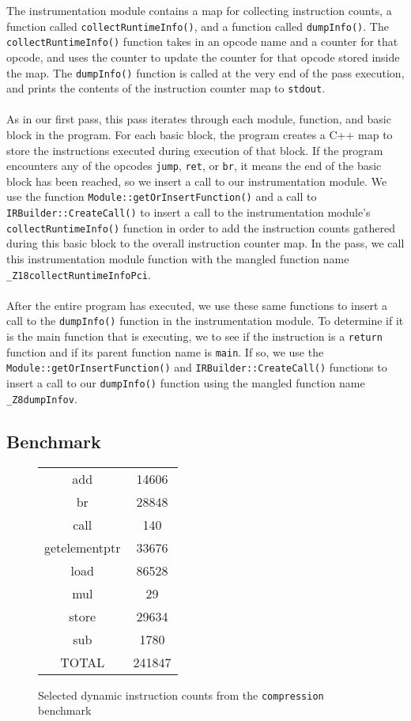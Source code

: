 \documentclass[12pt]{article}
\begin{document}
The instrumentation module contains a map for collecting instruction counts, a function called {\tt collectRuntimeInfo()}, and a function called {\tt dumpInfo()}. The {\tt collectRuntimeInfo()} function takes in an opcode name and a counter for that opcode, and uses the counter to update the counter for that opcode stored inside the map. The {\tt dumpInfo()} function is called at the very end of the pass execution, and prints the contents of the instruction counter map to {\tt stdout}. 
\\\\
As in our first pass, this pass iterates through each module, function, and basic block in the program. For each basic block, the program creates a C++ map to store the instructions executed during execution of that block. If the program encounters any of the opcodes {\tt jump}, {\tt ret}, or {\tt br}, it means the end of the basic block has been reached, so we insert a call to our instrumentation module. We use the function {\tt Module::getOrInsertFunction()} and a call to {\tt IRBuilder::CreateCall()}  to insert a call to the instrumentation module's {\tt collectRuntimeInfo()} function in order to add the instruction counts gathered during this basic block to the overall instruction counter map.    In the pass, we call this instrumentation module function with the mangled function name {\tt \_Z18collectRuntimeInfoPci}. 
\\\\
After the entire program has executed, we use these same functions to insert a call to the {\tt dumpInfo()} function in the instrumentation module. To determine if it is the main function that is executing, we to see if the instruction is a {\tt return} function and if its parent function name is {\tt main}. If so, we use the {\tt Module::getOrInsertFunction()} and {\tt IRBuilder::CreateCall()} functions to insert a call to our {\tt dumpInfo()} function using the mangled function name {\tt \_Z8dumpInfov}. 


\subsection{Benchmark}

\begin{figure*}[!t]
\begin{center}
\begin{tabular} { |c|c| }
\hline
	add & 14606 \\
	br & 28848 \\
	call & 140 \\
	getelementptr & 33676 \\
	load & 86528 \\
	mul & 29 \\
	store & 29634 \\
	sub & 1780 \\
	TOTAL & 241847 \\
\hline
\end{tabular}
\caption{Selected dynamic instruction counts from the {\tt compression} benchmark}
\label{DYNAMIC}
\end{center}
\end{figure*}
\end{document}
